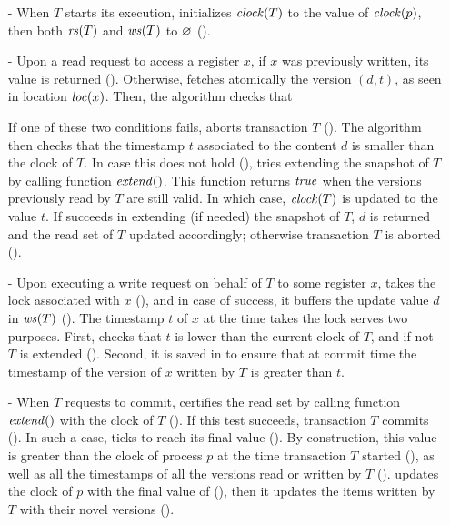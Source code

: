 \begin{itemize}
\item[-] %
  When $T$ starts its execution,  initializes $\clockOf{T}$ to the value of $\clockOf{p}$, then both $\readSetOf{T}$ and $\writeSetOf{T}$ to $\emptySet$ ().
\item[-] %
  Upon a read request to access a register $x$, if $x$ was previously written, its value is returned ().
  Otherwise,  fetches atomically the version $(d,t)$, as seen in location $\locationOf{x}$.
  Then, the algorithm checks that 
  If one of these two conditions fails,  aborts transaction $T$ ().
  The algorithm then checks that the timestamp $t$ associated to the content $d$ is smaller than the clock of $T$.
  In case this does not hold (),  tries extending the snapshot of $T$ by calling function $\stmExtend{}$.
  This function returns $\true$ when the versions previously read by $T$ are still valid.
  In which case, $\clockOf{T}$ is updated to the value $t$.
  If  succeeds in extending (if needed) the snapshot of $T$, $d$ is returned and the read set of $T$ updated accordingly;
  otherwise transaction $T$ is aborted ().
\item[-] %
  Upon executing a write request on behalf of $T$ to some register $x$, 
   takes the lock associated with $x$ (),
  and in case of success, it buffers the update value $d$ in $\writeSetOf{T}$ ().
  The timestamp $t$ of $x$ at the time  takes the lock serves two purposes.
  First,  checks that $t$ is lower than the current clock of $T$, and if not $T$ is extended ().
  Second, it is saved in  to ensure that at commit time the timestamp of the version of $x$ written by $T$ is greater than $t$.
\item[-] %
  When $T$ requests to commit,  certifies the read set 
  by calling function $\stmExtend{}$ with the clock of $T$ ().
  If this test succeeds, transaction $T$ commits ().
  In such a case,  ticks to reach its final value ().
  By construction, this value is greater than the clock of process $p$ at the time transaction $T$ started (),
  as well as all the timestamps of all the versions read or written by $T$ ().
   updates the clock of $p$ with the final value of   (), 
  then it updates the items written by $T$ with their novel versions ().
\end{itemize}

